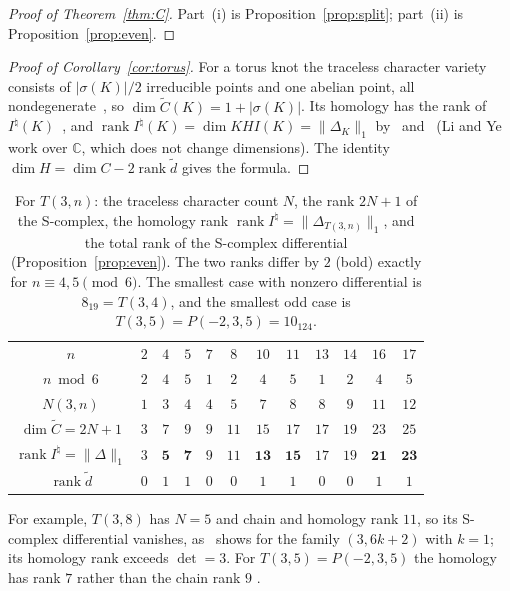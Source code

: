 \documentclass[11pt,reqno]{amsart}
\theoremstyle{plain}
\theoremstyle{definition}
\newcommand{\C}{\mathbb{C}}
\newcommand{\Inat}{I^{\natural}}
\newcommand{\td}{\widetilde d}
\begin{document}
\begin{proof}[Proof of Theorem~\ref{thm:C}]
Part~(i) is Proposition~\ref{prop:split}; part~(ii) is Proposition~\ref{prop:even}.
\end{proof}

\begin{proof}[Proof of Corollary~\ref{cor:torus}]
For a torus knot the traceless character variety consists of $|\sigma(K)|/2$ irreducible points and one
abelian point, all nondegenerate~\cite[\S9.5]{DSEquiv}, so $\dim\widetilde C(K)=1+|\sigma(K)|$. Its
homology has the rank of $\Inat(K)$~\cite[Thm.~8.9]{DSEquiv}, and
$\operatorname{rank}\Inat(K)=\dim KHI(K)=\|\Delta_K\|_1$ by~\cite[Prop.~1.4]{KM2} and~\cite[Cor.~1.8]{LiYe}
(Li and Ye work over $\C$, which does not change dimensions). The identity $\dim H=\dim
C-2\operatorname{rank}\td$ gives the formula.
\end{proof}

\begin{table}[ht]
\centering
\begin{tabular}{c|ccccccccccc}
$n$ & $2$ & $4$ & $5$ & $7$ & $8$ & $10$ & $11$ & $13$ & $14$ & $16$ & $17$\\
$n\bmod 6$ & $2$ & $4$ & $5$ & $1$ & $2$ & $4$ & $5$ & $1$ & $2$ & $4$ & $5$\\ \hline
$N(3,n)$ & $1$ & $3$ & $4$ & $4$ & $5$ & $7$ & $8$ & $8$ & $9$ & $11$ & $12$\\
$\dim\widetilde C=2N+1$ & $3$ & $7$ & $9$ & $9$ & $11$ & $15$ & $17$ & $17$ & $19$ & $23$ & $25$\\
$\operatorname{rank}\Inat=\|\Delta\|_1$ & $3$ & $\mathbf 5$ & $\mathbf 7$ & $9$ & $11$ & $\mathbf{13}$ &
$\mathbf{15}$ & $17$ & $19$ & $\mathbf{21}$ & $\mathbf{23}$\\
$\operatorname{rank}\td$ & $0$ & $1$ & $1$ & $0$ & $0$ & $1$ & $1$ & $0$ & $0$ & $1$ & $1$\\
\end{tabular}
\medskip
\caption{For $T(3,n)$: the traceless character count $N$, the rank $2N+1$ of the S-complex, the homology
rank $\operatorname{rank}\Inat=\|\Delta_{T(3,n)}\|_1$, and the total rank of the S-complex differential
(Proposition~\ref{prop:even}). The two ranks differ by $2$ (bold) exactly for $n\equiv4,5\pmod6$. The
smallest case with nonzero differential is $8_{19}=T(3,4)$, and the smallest odd case is
$T(3,5)=P(-2,3,5)=10_{124}$.}
\label{tab:3n}
\end{table}

For example, $T(3,8)$ has $N=5$ and chain and homology rank $11$, so its S-complex differential vanishes,
as~\cite[Prop.~9.37]{DSEquiv} shows for the family $(3,6k+2)$ with $k=1$; its homology rank exceeds
$\det=3$. For $T(3,5)=P(-2,3,5)$ the homology has rank $7$ rather than the chain rank $9$
\cite[\S9.3]{DSEquiv}.
\end{document}
